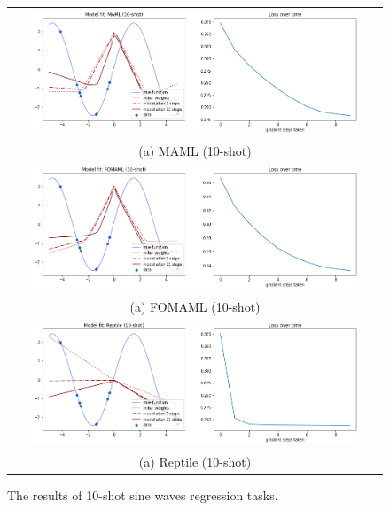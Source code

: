\documentclass[final]{cvpr}
\begin{document}
\begin{figure}[b]
    \centering
	\begin{tabular}{c}
		\includegraphics[width=0.9\textwidth]{resources/maml_10.png}\\
		(a) MAML (10-shot) \\
		\includegraphics[width=0.9\textwidth]{resources/fomaml_10.png}\\
		(a) FOMAML (10-shot) \\
		\includegraphics[width=0.9\textwidth]{resources/reptile_10.png}\\
		(a) Reptile (10-shot) \\
	\end{tabular}\vspace{0.2cm}
	\caption{The results of 10-shot sine waves regression tasks.}
	\label{sin10}
\end{figure}

{\small


}
\end{document}
